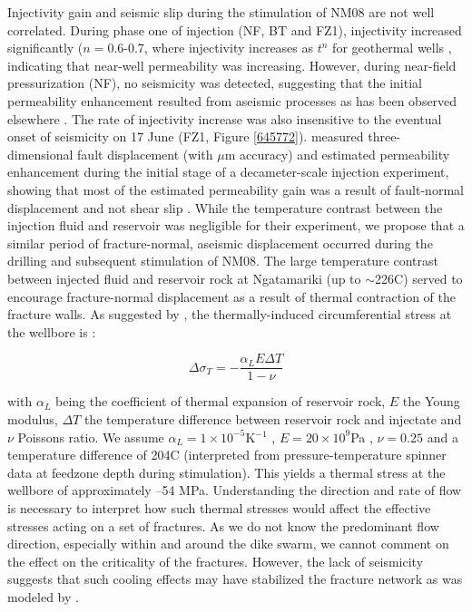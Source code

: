Injectivity gain and seismic slip during the \gls{stimulation} of NM08 are not well correlated. During phase one of injection (NF, BT and FZ1), \gls{injectivity} increased significantly ($n=$0.6-0.7, where \gls{injectivity} increases as $t^n$ for geothermal wells \citep{Clearwater_2015,grant2013thermal}, indicating that near-well \gls{permeability} was increasing. However, during near-field pressurization (NF), no seismicity was detected, suggesting that the initial \gls{permeability} enhancement resulted from aseismic processes as has been observed elsewhere \citep[][and references therein]{Cornet_2016}. The rate of \gls{injectivity} increase was also insensitive to the eventual onset of seismicity on 17 June (FZ1, Figure \ref{645772}). \citet{Guglielmi_2015} measured three-dimensional fault displacement (with $\mu$m accuracy) and estimated \gls{permeability} enhancement during the initial stage of a decameter-scale injection experiment, showing that most of the estimated \gls{permeability} gain was a result of fault-normal displacement and not shear slip \citep{Guglielmi_2015}. While the temperature contrast between the injection fluid and reservoir was negligible for their experiment, we propose that a similar period of fracture-normal, aseismic displacement occurred during the drilling and subsequent \gls{stimulation} of NM08. The large temperature contrast between injected fluid and reservoir rock at Ngatamariki (up to $\sim$226\textdegree C) served to encourage fracture-normal displacement as a result of thermal contraction of the fracture walls. As suggested by \citet{stephens1982hydraulic}, the thermally-induced circumferential stress at the wellbore is \cite{zoback2010}:

\begin{equation}
\Delta\sigma_{T} = -\frac{\alpha_{L}E\Delta{T}}{1 - \nu}
\end{equation}

with $\alpha_{L}$ being the coefficient of thermal expansion of reservoir rock, $E$ the Young modulus, $\Delta{T}$ the temperature difference between reservoir rock and injectate and $\nu$ Poissons ratio. We assume $\alpha_{L}=1\times10^{-5}$K$^{-1}$ \citep{Bauer_1983}, $E = 20\times10^{9}$Pa \citep{Cant_2018}, $\nu = 0.25$ and a temperature difference of 204\textdegree C (interpreted from pressure-temperature spinner data at \gls{feedzone} depth during \gls{stimulation}). This yields a thermal stress at the wellbore of approximately --54 MPa. Understanding the direction and rate of flow is necessary to interpret how such thermal stresses would affect the effective stresses acting on a set of fractures. As we do not know the predominant flow direction, especially within and around the dike swarm, we cannot comment on the effect on the criticality of the fractures. However, the lack of seismicity suggests that such cooling effects may have stabilized the fracture network as was modeled by \citet{Jeanne_2015tensor}.

